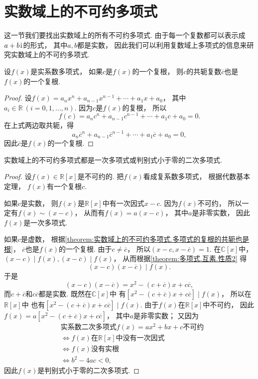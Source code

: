 \section{实数域上的不可约多项式}
这一节我们要找出实数域上的所有不可约多项式.
由于每一个复数都可以表示成\(a+b\kern1pt\mathrm{i}\kern1pt\)的形式，
其中\(a,b\)都是实数，
因此我们可以利用复数域上多项式的信息来研究实数域上的不可约多项式.

\begin{theorem}\label{theorem:实数域上的不可约多项式.多项式的复根的共轭也是根}
设\(f(x)\)是实系数多项式，
如果\(c\)是\(f(x)\)的一个复根，
则\(c\)的共轭复数\(\overline{c}\)也是\(f(x)\)的一个复根.
\begin{proof}
设\(f(x)=a_n x^n+a_{n-1} x^{n-1}+\dotsb+a_1 x+a_0\)，
其中\(a_i\in\mathbb{R}\ (i=0,1,\dotsc,n)\).
因为\(c\)是\(f(x)\)的复根，
所以\[
	f(c)=a_n c^n+a_{n-1} c^{n-1}+\dotsb+a_1 c+a_0=0.
\]
在上式两边取共轭，得\[
	a_n \overline{c}^n+a_{n-1} \overline{c}^{n-1}+\dotsb+a_1 \overline{c}+a_0=0,
\]
因此\(\overline{c}\)是\(f(x)\)的一个复根.
\end{proof}
\end{theorem}

\begin{theorem}
实数域上的不可约多项式都是一次多项式或判别式小于零的二次多项式.
\begin{proof}
设\(f(x)\in\mathbb{R}[x]\)是不可约的.
把\(f(x)\)看成复系数多项式，
根据代数基本定理，
\(f(x)\)有一个复根\(c\).

如果\(c\)是实数，
则\(f(x)\)是\(\mathbb{R}[x]\)中有一次因式\(x-c\).
因为\(f(x)\)不可约，
所以一定有\(f(x) \sim (x-c)\)，
从而有\(f(x)=a(x-c)\)，
其中\(a\)是非零实数，
因此\(f(x)\)是一次多项式.

如果\(c\)是虚数，
根据\cref{theorem:实数域上的不可约多项式.多项式的复根的共轭也是根}，
\(\overline{c}\)也是\(f(x)\)的一个复根.
由于\(c\neq\overline{c}\)，
所以\((x-c,x-\overline{c})=1\).
在\(\mathbb{C}[x]\)中，
\((x-c) \mid f(x),
(x-\overline{c}) \mid f(x)\)，
从而根据\cref{theorem:多项式.互素.性质2} 得\[
	(x-c)(x-\overline{c}) \mid f(x).
\]
于是\[
	(x-c)(x-\overline{c})
	=x^2-(c+\overline{c})x+c\overline{c},
\]
而\(c+\overline{c}\)和\(c\overline{c}\)都是实数.
既然在\(\mathbb{C}[x]\)中
有\([x^2-(c+\overline{c})x+c\overline{c}] \mid f(x)\)，
所以在\(\mathbb{R}[x]\)中
也有\([x^2-(c+\overline{c})x+c\overline{c}] \mid f(x)\).
由于\(f(x)\)在\(\mathbb{R}[x]\)中不可约，
因此\(f(x)=a[x^2-(c+\overline{c})x+c\overline{c}]\)，
其中\(a\)是非零实数；
又因为\begin{align*}
	&\text{实系数二次多项式$f(x)=ax^2+bx+c$不可约} \\
	&\iff \text{$f(x)$在$\mathbb{R}[x]$中没有一次因式} \\
	&\iff \text{$f(x)$没有实根} \\
	&\iff b^2-4ac<0,
\end{align*}
因此\(f(x)\)是判别式小于零的二次多项式.
\end{proof}
\end{theorem}

